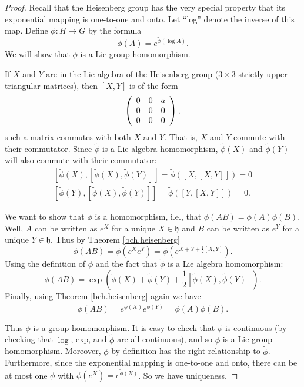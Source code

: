 \documentclass{amsbook}
\let \frak = \mathfrak
\theoremstyle{plain}
\numberwithin{equation}{chapter}
\numberwithin{theorem}{chapter}
\begin{document}
\begin{proof}
Recall that the Heisenberg group has the very special property that its
exponential mapping is one-to-one and onto. Let ``log'' denote the inverse of
this map. Define $\phi:H\rightarrow G$ by the formula
\[
\phi\left(  A\right)  =e^{\widetilde{\phi}\left(  \log A\right)  }\text{.}%
\]
We will show that $\phi$ is a Lie group homomorphism.

If $X$ and $Y$ are in the Lie algebra of the Heisenberg group ($3\times3$
strictly upper-triangular matrices), then $\left[  X,Y\right]  $ is of the
form
\[
\left(
\begin{array}
[c]{lll}%
0 & 0 & a\\
0 & 0 & 0\\
0 & 0 & 0
\end{array}
\right)  ;
\]
such a matrix commutes with both $X$ and $Y$. That is, $X$ and $Y$ commute
with their commutator. Since $\widetilde{\phi}$ is a Lie algebra homomorphism,
$\widetilde{\phi}\left(  X\right)  $ and $\widetilde{\phi}\left(  Y\right)  $
will also commute with their commutator:
\begin{align*}
\left[  \widetilde{\phi}\left(  X\right)  ,\left[  \widetilde{\phi}\left(
X\right)  ,\widetilde{\phi}\left(  Y\right)  \right]  \right]  =\widetilde
{\phi}\left(  \left[  X,\left[  X,Y\right]  \right]  \right)  =0\\
\left[  \widetilde{\phi}\left(  Y\right)  ,\left[  \widetilde{\phi}\left(
X\right)  ,\widetilde{\phi}\left(  Y\right)  \right]  \right]  =\widetilde
{\phi}\left(  \left[  Y,\left[  X,Y\right]  \right]  \right)  =0\text{.}%
\end{align*}

We want to show that $\phi$ is a homomorphism, i.e., that $\phi\left(
AB\right)  =\phi\left(  A\right)  \phi\left(  B\right)  $. Well, $A$ can be
written as $e^{X}$ for a unique $X\in\frak{h}$ and $B$ can be written as
$e^{Y}$ for a unique $Y\in\frak{h}$. Thus by Theorem \ref{bch.heisenberg}
\[
\phi\left(  AB\right)  =\phi\left(  e^{X}e^{Y}\right)  =\phi\left(
e^{X+Y+\frac{1}{2}\left[  X,Y\right]  }\right)  \text{.}%
\]
Using the definition of $\phi$ and the fact that $\widetilde{\phi}$ is a Lie
algebra homomorphism:
\[
\phi\left(  AB\right)  =\exp\left(  \widetilde{\phi}\left(  X\right)
+\widetilde{\phi}\left(  Y\right)  +\frac{1}{2}\left[  \widetilde{\phi}\left(
X\right)  ,\widetilde{\phi}\left(  Y\right)  \right]  \right)  \text{.}%
\]
Finally, using Theorem \ref{bch.heisenberg} again we have
\[
\phi\left(  AB\right)  =e^{\widetilde{\phi}\left(  X\right)  }e^{\widetilde
{\phi}\left(  Y\right)  }=\phi\left(  A\right)  \phi\left(  B\right)  \text{.}%
\]

Thus $\phi$ is a group homomorphism. It is easy to check that $\phi$ is
continuous (by checking that $\log$, exp, and $\widetilde{\phi}$ are all
continuous), and so $\phi$ is a Lie group homomorphism. Moreover, $\phi$ by
definition has the right relationship to $\widetilde{\phi}$. Furthermore,
since the exponential mapping is one-to-one and onto, there can be at most one
$\phi$ with $\phi\left(  e^{X}\right)  =e^{\widetilde{\phi}\left(  X\right)
}$. So we have uniqueness.
\end{proof}
\end{document}
